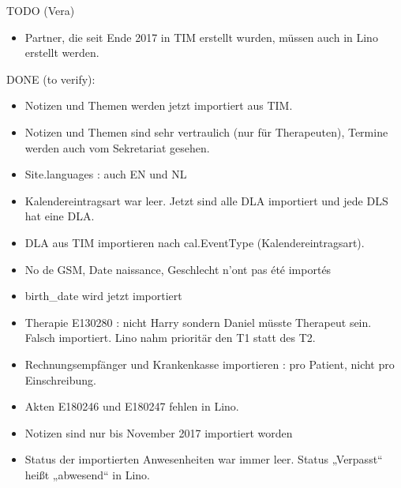 \documentclass[letterpaper,10pt,ngerman]{sphinxmanual}
\begin{document}
TODO (Vera)
\begin{itemize}
\item {} 
Partner, die seit Ende 2017 in TIM erstellt wurden, müssen auch in
Lino erstellt werden.

\end{itemize}

DONE (to verify):
\begin{itemize}
\item {} 
Notizen und Themen werden jetzt importiert aus TIM.

\item {} 
Notizen und Themen sind sehr vertraulich (nur für Therapeuten),
Termine werden auch vom Sekretariat gesehen.

\item {} 
Site.languages : auch EN und NL

\item {} 
Kalendereintragsart war leer. Jetzt sind alle DLA importiert und
jede DLS hat eine DLA.

\item {} 
DLA aus TIM importieren nach cal.EventType (Kalendereintragsart).

\item {} 
No de GSM, Date naissance, Geschlecht n’ont pas été importés

\item {} 
birth\_date wird jetzt importiert

\item {} 
Therapie E130280 : nicht Harry sondern Daniel müsste Therapeut
sein. Falsch importiert. Lino nahm prioritär den T1 statt des T2.

\item {} 
Rechnungsempfänger und Krankenkasse importieren : pro Patient, nicht
pro Einschreibung.

\item {} 
Akten E180246 und E180247 fehlen in Lino.

\item {} 
Notizen sind nur bis November 2017 importiert worden

\item {} 
Status der importierten Anwesenheiten war immer leer.  Status
„Verpasst“ heißt „abwesend“ in Lino.

\end{itemize}
\end{document}

